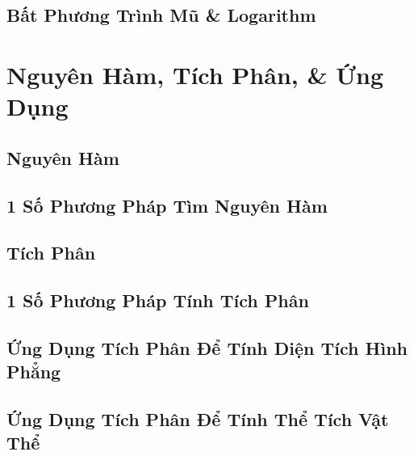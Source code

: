\documentclass[oneside]{book}
\numberwithin{equation}{section}
\begin{document}
\section{Bất Phương Trình Mũ \& Logarithm}


\chapter{Nguyên Hàm, Tích Phân, \& Ứng Dụng}

\section{Nguyên Hàm}


\section{1 Số Phương Pháp Tìm Nguyên Hàm}


\section{Tích Phân}


\section{1 Số Phương Pháp Tính Tích Phân}


\section{Ứng Dụng Tích Phân Để Tính Diện Tích Hình Phẳng}


\section{Ứng Dụng Tích Phân Để Tính Thể Tích Vật Thể}
\end{document}
